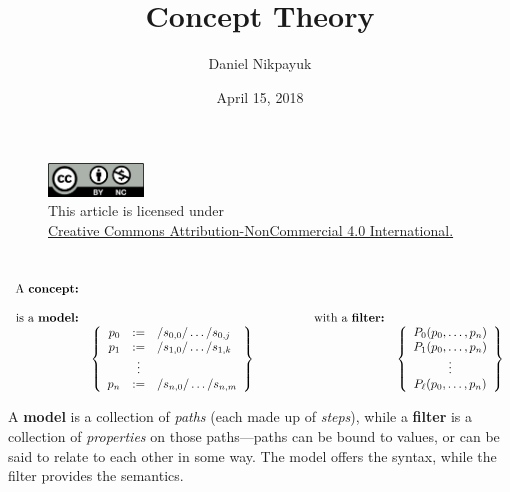 \documentclass[twoside]{article}
\title{Concept Theory}
\author{Daniel Nikpayuk}
\date{April 15, 2018}
\begin{document}
\maketitle
\thispagestyle{empty}

\begin{figure}[h]
\centering
\includegraphics[width=1in]{../../../../cc-by-nc.png}\\[0.1in]
\tiny This article is licensed under \\
\href{http://creativecommons.org/licenses/by-nc/4.0/}
{Creative Commons Attribution-NonCommercial 4.0 International.}\\[0.3in]
\end{figure}


\ \\[0.5cm]

$$ \begin{array}{rlrl}
 \mbox{A \bfseries concept:}										\\
													\\
 \mbox{is a \bfseries model:}	&			&  \qquad\qquad \mbox{with a \bfseries filter:}	\\
 & \left\{\begin{array}{rcl}
   p_0	& :=		& /s_{0,0}/\ldots/s_{0,j}			\\
   p_1	& :=		& /s_{1,0}/\ldots/s_{1,k}			\\
         & \vdots	& 						\\
   p_n	& :=		& /s_{n,0}/\ldots/s_{n,m}			\\
   \end{array}\right\} && \left\{\begin{array}{c}
   P_0(p_0,\ldots,p_n)							\\
   P_1(p_0,\ldots,p_n)							\\
   \vdots								\\
   P_\ell(p_0,\ldots,p_n)						\\
   \end{array}\right\}
\end{array} $$

A {\bfseries model} is a collection of \emph{paths} (each made up of \emph{steps}), while a {\bfseries filter} is a collection
of \emph{properties} on those paths---paths can be bound to values, or can be said to relate to each other in some way.
The model offers the syntax, while the filter provides the semantics.
\end{document}
